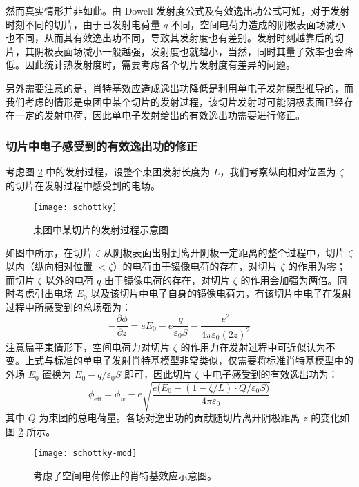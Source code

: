 然而真实情形并非如此。由 Dowell 发射度公式及有效逸出功公式可知，对于发射时刻不同的切片，由于已发射电荷量 $q$ 不同，空间电荷力造成的阴极表面场减小也不同，从而其有效逸出功不同，导致其发射度也有差别。发射时刻越靠后的切片，其阴极表面场减小一般越强，发射度也就越小，当然，同时其量子效率也会降低。因此统计热发射度时，需要考虑各个切片发射度有差异的问题。

另外需要注意的是，肖特基效应造成逸出功降低是利用单电子发射模型推导的，而我们考虑的情形是束团中某个切片的发射过程，该切片发射时可能阴极表面已经存在一定的发射电荷，因此单电子发射给出的有效逸出功需要进行修正。

\subsubsection{切片中电子感受到的有效逸出功的修正}
考虑图 \ref{fig:schottky-mod} 中的发射过程，设整个束团发射长度为 $L$，我们考察纵向相对位置为 $\zeta$ 的切片在发射过程中感受到的电场。
\begin{figure}[htbp]
\centering
\texttt{[image: schottky]}
\caption{\label{fig:schottky-mod} 束团中某切片的发射过程示意图}
\end{figure}
如图中所示，在切片 $\zeta$ 从阴极表面出射到离开阴极一定距离的整个过程中，切片 $\zeta$ 以内（纵向相对位置 $< \zeta$）的电荷由于镜像电荷的存在，对切片 $\zeta$ 的作用为零；而切片 $\zeta$ 以外的电荷 $q$ 由于镜像电荷的存在，对切片 $\zeta$ 的作用会加强为两倍。同时考虑引出电场 $E_0$ 以及该切片中电子自身的镜像电荷力，有该切片中电子在发射过程中所感受到的总场强为：
\begin{equation}
-\frac{\partial\phi}{\partial z} = eE_0-e\frac{q}{\varepsilon_0 S}-\frac{e^2}{4\pi\varepsilon_0(2z)^2}
\end{equation}
注意扁平束情形下，空间电荷力对切片 $\zeta$ 的作用力在发射过程中可近似认为不变。上式与标准的单电子发射肖特基模型非常类似，仅需要将标准肖特基模型中的外场 $E_0$ 置换为 $E_0-q/\varepsilon_0S$ 即可，因此切片 $\zeta$ 中电子感受到的有效逸出功为：
\begin{equation}
\phi_{\text{eff}} = \phi_{w} - e\sqrt{\frac{e\big(E_0-(1-\zeta/L)\cdot Q/\varepsilon_0S\big)}{4\pi\varepsilon_0}}
\end{equation}
其中 $Q$ 为束团的总电荷量。各场对逸出功的贡献随切片离开阴极距离 $z$ 的变化如图 \ref{fig:schottky-mod} 所示。
\begin{figure}[htbp]
\centering
\texttt{[image: schottky-mod]}
\caption{\label{fig:schottky-mod} 考虑了空间电荷修正的肖特基效应示意图。}
\end{figure}

